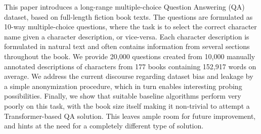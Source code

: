 This paper introduces a long-range multiple-choice Question Answering (QA) dataset, based on full-length fiction book texts. The questions are formulated as 10-way multiple-choice questions, where the task is to select the correct character name given a character description, or vice-versa. Each character description is formulated in natural text and often contains information from several sections throughout the book. We provide 20,000 questions created from 10,000 manually annotated descriptions of characters from 177 books containing 152,917 words on average. We address the current discourse regarding dataset bias and leakage by a simple anonymization procedure, which in turn enables interesting probing possibilities. Finally, we show that suitable baseline algorithms perform very poorly on this task, with the book size itself making it non-trivial to attempt a Transformer-based QA solution. This leaves ample room for future improvement, and hints at the need for a completely different type of solution.
